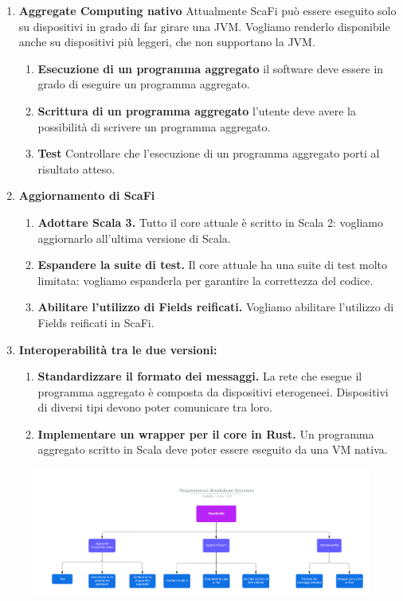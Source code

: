 \documentclass[12pt, a4paper]{article}
\begin{document}
\begin{enumerate}
    \item \textbf{Aggregate Computing nativo} Attualmente ScaFi può essere eseguito solo su dispositivi in grado di 
    far girare una JVM. Vogliamo renderlo disponibile anche su dispositivi più leggeri, che non supportano la JVM.
        \begin{enumerate}
            \item \textbf{Esecuzione di un programma aggregato} il software deve essere in grado di eseguire un 
            programma aggregato.
            \item \textbf{Scrittura di un programma aggregato} l'utente deve avere la possibilità di scrivere un 
            programma aggregato.
            \item \textbf{Test} Controllare che l'esecuzione di un programma aggregato porti al risultato atteso.
        \end{enumerate}

    \item \textbf{Aggiornamento di ScaFi}
        \begin{enumerate}
            \item \textbf{Adottare Scala 3.} Tutto il core attuale è scritto in Scala 2: vogliamo aggiornarlo 
            all'ultima versione di Scala.
            \item \textbf{Espandere la suite di test.} Il core attuale ha una suite di test molto limitata: vogliamo
            espanderla per garantire la correttezza del codice. 
            \item \textbf{Abilitare l'utilizzo di Fields reificati.} Vogliamo abilitare l'utilizzo di Fields reificati
            in ScaFi.
        \end{enumerate}

    \item \textbf{Interoperabilità tra le due versioni:}
        \begin{enumerate}
            \item \textbf{Standardizzare il formato dei messaggi.} La rete che esegue il programma aggregato è composta 
            da dispositivi eterogeneei. Dispositivi di diversi tipi devono poter comunicare tra loro.
            \item \textbf{Implementare un wrapper per il core in Rust.} Un programma aggregato scritto in Scala deve 
            poter essere eseguito da una VM nativa.
        \end{enumerate}
\end{enumerate}

\begin{figure}[h]
    \includegraphics[angle=90, width=\textwidth, height=\textheight]{res/rbs.png}
\end{figure}
\end{document}
